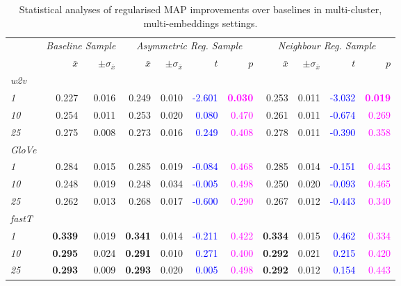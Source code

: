 \begin{table}\centering
\begin{tabular}{@{}lrrrrrrrrrr@{}}\toprule
& \multicolumn{2}{c}{\textit{Baseline Sample}} & \multicolumn{4}{c}{\textit{Asymmetric Reg. Sample}} &
\multicolumn{4}{c}{\textit{Neighbour Reg. Sample}}\\
\cmidrule{2-11}
& $\bar{x}$ & $\pm\sigma_{\bar{x}}$ & $\bar{x}$ & $\pm\sigma_{\bar{x}}$ & $t$ & $p$ & 
$\bar{x}$ & $\pm\sigma_{\bar{x}}$ & $t$ & $p$ \\ \midrule
\textit{w2v}\\
\textit{1} & 0.227 & 0.016 & 0.249 & 0.010 & \textcolor{blue}{-2.601} & \textcolor{magenta}{\textbf{0.030}} & 0.253 & 0.011 & \textcolor{blue}{-3.032} & \textcolor{magenta}{\textbf{0.019}}\\
\textit{10} & 0.254 & 0.011 & 0.253 & 0.020 & \textcolor{blue}{0.080} & \textcolor{magenta}{0.470} & 0.261 & 0.011 & \textcolor{blue}{-0.674} & \textcolor{magenta}{0.269}\\
\textit{25} & 0.275 & 0.008 & 0.273 & 0.016 & \textcolor{blue}{0.249} & \textcolor{magenta}{0.408} & 0.278 & 0.011 & \textcolor{blue}{-0.390} & \textcolor{magenta}{0.358}\\
\cmidrule(lr){2-11}
\textit{GloVe}\\
\textit{1} & 0.284 & 0.015 & 0.285 & 0.019 & \textcolor{blue}{-0.084} & \textcolor{magenta}{0.468} & 0.285 & 0.014 & \textcolor{blue}{-0.151} & \textcolor{magenta}{0.443}\\
\textit{10} & 0.248 & 0.019 & 0.248 & 0.034 & \textcolor{blue}{-0.005} & \textcolor{magenta}{0.498} & 0.250 & 0.020 & \textcolor{blue}{-0.093} & \textcolor{magenta}{0.465}\\
\textit{25} & 0.262 & 0.013 & 0.268 & 0.017 & \textcolor{blue}{-0.600} & \textcolor{magenta}{0.290} & 0.267 & 0.012 & \textcolor{blue}{-0.443} & \textcolor{magenta}{0.340}\\
\cmidrule(lr){2-11}
\textit{fastT}\\
\textit{1} & \textbf{0.339} & 0.019 & \textbf{0.341} & 0.014 & \textcolor{blue}{-0.211} & \textcolor{magenta}{0.422} & \textbf{0.334} & 0.015 & \textcolor{blue}{0.462} & \textcolor{magenta}{0.334}\\
\textit{10} & \textbf{0.295} & 0.024 & \textbf{0.291} & 0.010 & \textcolor{blue}{0.271} & \textcolor{magenta}{0.400} & \textbf{0.292} & 0.021 & \textcolor{blue}{0.215} & \textcolor{magenta}{0.420}\\
\textit{25} & \textbf{0.293} & 0.009 & \textbf{0.293} & 0.020 & \textcolor{blue}{0.005} & \textcolor{magenta}{0.498} & \textbf{0.292} & 0.012 & \textcolor{blue}{0.154} & \textcolor{magenta}{0.443}\\
\bottomrule
\end{tabular}
\caption{Statistical analyses of regularised \ac{MAP} improvements over baselines in multi-cluster, multi-embeddings settings.}\label{tab:t_test_regularised}
\end{table}
